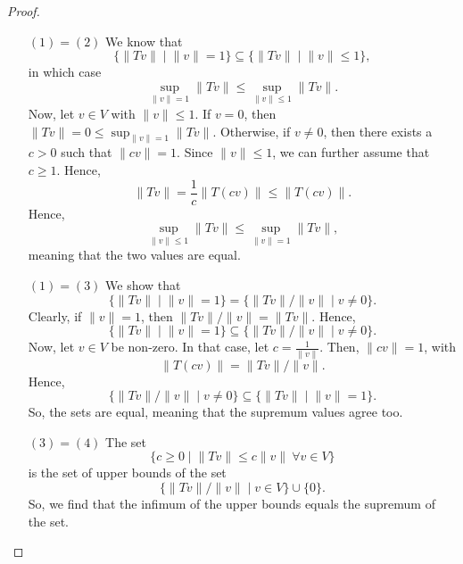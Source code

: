 \documentclass[a4paper, openany]{memoir}
\theoremstyle{definition}
\theoremstyle{plain}
\begin{document}
    \begin{proof}
        \hspace*{0pt}
        \begin{enumerate}
            \item[$(1) = (2)$] We know that 
            \[\{\lVert Tv \rVert \mid \lVert v \rVert = 1\} \subseteq \{\lVert Tv \rVert \mid \lVert v \rVert \leq 1\},\]
            in which case 
            \[\sup_{\lVert v \rVert = 1} \lVert Tv \rVert \leq \sup_{\lVert v \rVert \leq 1} \lVert Tv \rVert.\]
            Now, let $v \in V$ with $\lVert v \rVert \leq 1$. If $v = 0$, then $\lVert Tv \rVert = 0 \leq \sup_{\lVert v \rVert = 1} \lVert Tv \rVert$. Otherwise, if $v \neq 0$, then there exists a $c > 0$ such that $\lVert cv \rVert = 1$. Since $\lVert v \rVert \leq 1$, we can further assume that $c \geq 1$. Hence,
            \[\lVert Tv \rVert = \frac{1}{c} \lVert T(cv) \rVert \leq \lVert T(cv) \rVert.\]
            Hence, 
            \[\sup_{\lVert v \rVert \leq 1} \lVert Tv \rVert \leq \sup_{\lVert v \rVert = 1} \lVert Tv \rVert,\]
            meaning that the two values are equal.
            
            \item[$(1) = (3)$] We show that 
            \[\{\lVert Tv \rVert \mid \lVert v \rVert = 1\} = \{\lVert Tv \rVert/\lVert v \rVert \mid v \neq 0\}.\]
            Clearly, if $\lVert v \rVert = 1$, then $\lVert Tv \rVert/\lVert v \rVert = \lVert Tv \rVert$. Hence,
            \[\{\lVert Tv \rVert \mid \lVert v \rVert = 1\} \subseteq \{\lVert Tv \rVert/\lVert v \rVert \mid v \neq 0\}.\]
            Now, let $v \in V$ be non-zero. In that case, let $c = \frac{1}{\lVert v \rVert}$. Then, $\lVert cv \rVert = 1$, with 
            \[\lVert T(cv) \rVert = \lVert Tv \rVert/\lVert v \rVert.\]
            Hence, 
            \[\{\lVert Tv \rVert/\lVert v \rVert \mid v \neq 0\} \subseteq \{\lVert Tv \rVert \mid \lVert v \rVert = 1\}.\]
            So, the sets are equal, meaning that the supremum values agree too.
            
            \item[$(3) = (4)$] The set 
            \[\{c \geq 0 \mid \lVert Tv \rVert \leq c\lVert v \rVert \ \forall v \in V\}\]
            is the set of upper bounds of the set 
            \[\{\lVert Tv \rVert/\lVert v \rVert \mid v \in V\} \cup \{0\}.\]
            So, we find that the infimum of the upper bounds equals the supremum of the set.
        \end{enumerate}
    \end{proof}
\end{document}
